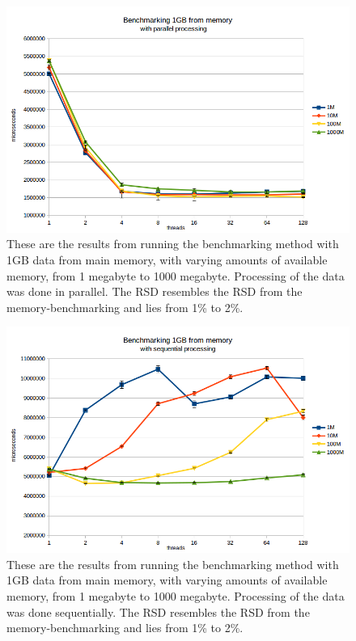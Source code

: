 \documentclass[a4paper]{article}
\begin{document}
\begin{figure}
	\begin{adjustwidth}{-0.5in}{-0.5in}
    \centering
     \includegraphics[scale=0.7]{../test_results/mem_par.png}
  	\caption{These are the results from running the benchmarking method with 1GB data from main memory, with varying amounts of available memory, from 1 megabyte to 1000 megabyte. Processing of the data was done in parallel. The RSD resembles the RSD from the memory-benchmarking and lies from 1\% to 2\%.}
	\label{figure:mem-par}
	\end{adjustwidth}
\end{figure}

\begin{figure}
	\begin{adjustwidth}{-0.5in}{-0.5in}
    \centering
     \includegraphics[scale=0.7]{../test_results/mem_seq.png}
  	\caption{These are the results from running the benchmarking method with 1GB data from main memory, with varying amounts of available memory, from 1 megabyte to 1000 megabyte. Processing of the data was done sequentially. The RSD resembles the RSD from the memory-benchmarking and lies from 1\% to 2\%.}
	\label{figure:mem-seq}
	\end{adjustwidth}
\end{figure}
\end{document}
